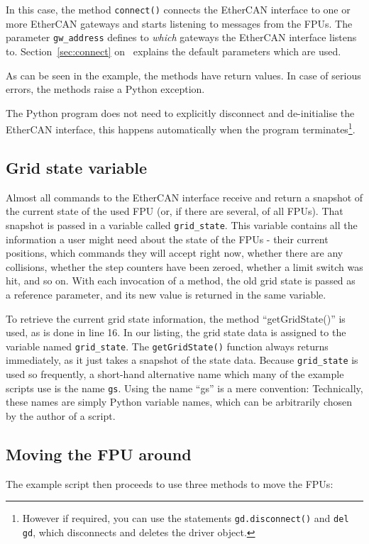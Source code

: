 \documentclass[11pt,a4paper]{scrartcl}
\begin{document}
In this case, the method \texttt{connect()} connects the EtherCAN interface to one
or more EtherCAN gateways and starts listening to messages from the
FPUs. The parameter \texttt{gw\_address} defines to \emph{which}
gateways the EtherCAN interface listens to. Section~\ref{sec:connect}
on~\pageref{sec:connect} explains the default parameters which are
used.

As can be seen in the example, the methods have return values.  In
case of serious errors, the methods raise a Python exception.

The Python program does not need to explicitly disconnect and
de-initialise the EtherCAN interface, this happens automatically when the program
terminates\footnote{However if required, you can use the statements
  \texttt{gd.disconnect()} and \texttt{del gd}, which disconnects and
  deletes the driver object.}.



\subsection{Grid state variable}
 Almost all commands to the EtherCAN interface
receive and return a snapshot of the current state of the used FPU
(or, if there are several, of all FPUs). That snapshot is passed in a
variable called \texttt{grid\_state}. This variable contains all the
information a user might need about the state of the FPUs - their
current positions, which commands they will accept right now, whether
there are any collisions, whether the step counters have been zeroed,
whether a limit switch was hit, and so on. With each invocation of a
method, the old grid state is passed as a reference parameter, and its
new value is returned in the same variable.

To retrieve the current grid state information, the method
``getGridState()'' is used, as is done in line 16. In our listing, the
grid state data is assigned to the variable named
\texttt{grid\_state}.  The \texttt{getGridState()} function always
returns immediately, as it just takes a snapshot of the state
data. Because \texttt{grid\_state} is used so frequently, a short-hand
alternative name which many of the example scripts use is the name
\texttt{gs}.  Using the name ``gs'' is a mere convention: Technically,
these names are simply Python variable names, which can be arbitrarily
chosen by the author of a script.

\subsection{Moving the FPU around}
The example script then proceeds to use three methods to move
the FPUs:
\end{document}
